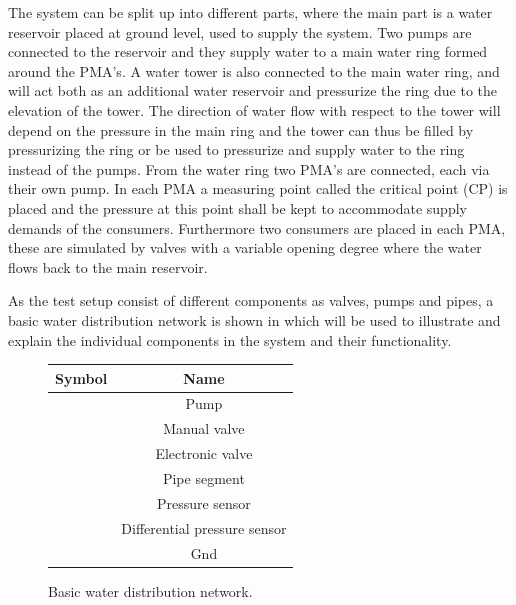 The system can be split up into different parts, where the main part is a water reservoir placed at ground level, used to supply the system. Two pumps are connected to the reservoir and they supply water to a main water ring formed around the PMA's. 
A water tower is also connected to the main water ring, and will act both as an additional water reservoir and pressurize the ring due to the elevation of the tower. The direction of water flow with respect to the tower will depend on the pressure in the main ring and the tower can thus be filled by pressurizing the ring or be used to pressurize and supply water to the ring instead of the pumps.  
From the water ring two PMA's are connected, each via their own pump. In each PMA a measuring point called the critical point (CP) is placed and the pressure at this point shall be kept to accommodate supply demands of the consumers. Furthermore two consumers are placed in each PMA, these are simulated by valves with a variable opening degree where the water flows back to the main reservoir.    

As the test setup consist of different components as valves, pumps and pipes, a basic water distribution network is shown in  which will be used to illustrate and explain the individual components in the system and their functionality.   
	
\begin{figure}[H]
	\centering
	\begin{minipage}[b]{0.45\textwidth}
		\centering
		 
		\caption{Basic water distribution network.}
		\label{fig:Basic_example_sys}
	\end{minipage}
	\hspace{15pt}
	\begin{minipage}[b]{0.45\textwidth}
		\begin{tabular}{|c|c|} \hline
  			\bfseries Symbol 	 					&   \bfseries Name 					\\ \hline
			 		  	&	Pump							\\ \hline
			 	&	Manual valve					\\ \hline
			 		&	Electronic valve				\\ \hline
			 		  	&	Pipe segment					\\ \hline
			 &	Pressure sensor					\\ \hline
			 	&	Differential pressure sensor	\\ \hline
			 		  	&	Gnd								\\ \hline
		\end{tabular}
		\label{tab:sys_comp_overview}
	\end{minipage}
\end{figure}


